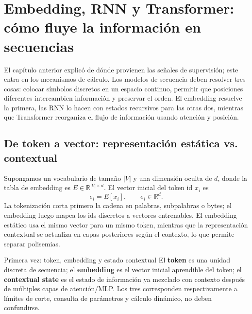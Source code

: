 \section{Embedding, RNN y Transformer: cómo fluye la información en secuencias}

El capítulo anterior explicó de dónde provienen las señales de supervisión; este entra en los mecanismos de cálculo. Los modelos de secuencia deben resolver tres cosas: colocar símbolos discretos en un espacio continuo, permitir que posiciones diferentes intercambien información y preservar el orden. El embedding resuelve la primera, las RNN lo hacen con estados recursivos para las otras dos, mientras que Transformer reorganiza el flujo de información usando atención y posición.

\subsection{De token a vector: representación estática vs. contextual}

Supongamos un vocabulario de tamaño $|V|$ y una dimensión oculta de $d$, donde la tabla de embedding es $E\in\mathbb{R}^{|V|\times d}$. El vector inicial del token id $x_i$ es
\[
e_i=E[x_i],\qquad e_i\in\mathbb{R}^{d}.
\]
La tokenización corta primero la cadena en palabras, subpalabras o bytes; el embedding luego mapea los ids discretos a vectores entrenables. El embedding estático usa el mismo vector para un mismo token, mientras que la representación contextual se actualiza en capas posteriores según el contexto, lo que permite separar polisemias.



\begin{knowledgebox}{Primera vez: token, embedding y estado contextual}
El \textbf{token} es una unidad discreta de secuencia; el \textbf{embedding} es el vector inicial aprendible del token; el \textbf{contextual state} es el estado de información ya mezclado con contexto después de múltiples capas de atención/MLP. Los tres corresponden respectivamente a límites de corte, consulta de parámetros y cálculo dinámico, no deben confundirse.
\end{knowledgebox}

